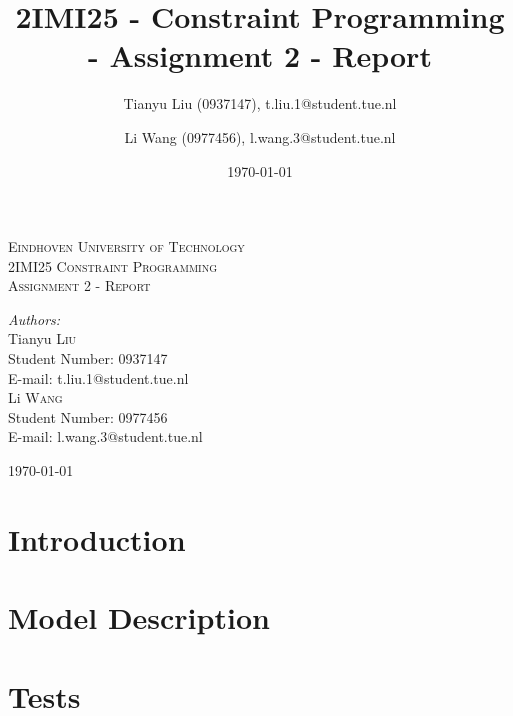 \documentclass[a4paper, 12pt]{article}
\title{2IMI25 - Constraint Programming - Assignment 2 - Report}
\author{Tianyu Liu (0937147), t.liu.1@student.tue.nl \and Li Wang (0977456), l.wang.3@student.tue.nl}
\date{\today}
\begin{document}
\begin{titlepage}
	\newcommand{\HRule}{\rule{\linewidth}{0.5mm}} %
	\centering
	\textsc{\LARGE Eindhoven University of Technology}\\[1.5cm]
	\textsc{\Large 2IMI25 Constraint Programming}\\[1.5cm]
	\textsc{\large Assignment 2 - Report}\\[3cm]
	\begin{minipage}{0.4\textwidth}
		\begin{flushleft} \large
			\emph{Authors:}\\ [0.5cm]
			Tianyu \textsc{Liu}\\
			Student Number: 0937147\\
			E-mail: t.liu.1@student.tue.nl\\ [0.2cm]
			Li \textsc{Wang}\\
			Student Number: 0977456\\
			E-mail: l.wang.3@student.tue.nl\\ [0.2cm]
		\end{flushleft}
	\end{minipage}
	
	\vspace{15ex}
	{\large \today}\\[3cm] %
	\vfill
\end{titlepage}

\setcounter{page}{1} 

\tableofcontents

\newpage 


\section{Introduction}

\newpage

\section{Model Description}

\newpage

\section{Tests}
\end{document}

